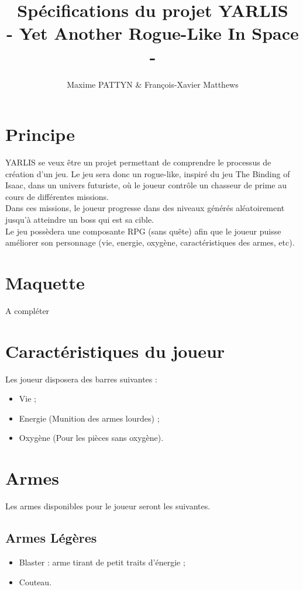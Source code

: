 \documentclass[a4paper,12pt]{article}
\title{Spécifications du projet YARLIS\\- Yet Another Rogue-Like In Space -}
\author{Maxime PATTYN \& François-Xavier Matthews}
\begin{document}
\maketitle

\section{Principe}
YARLIS se veux être un projet permettant de comprendre le processus de création d'un jeu.
Le jeu sera donc un rogue-like, inspiré du jeu The Binding of Isaac, dans un univers futuriste, 
où le joueur contrôle un chasseur de prime au cours de différentes missions.\\
Dans ces missions, le joueur progresse dans des niveaux générés aléatoirement jusqu'à atteindre un boss
qui est sa cible.\\
Le jeu possèdera une composante RPG (sans quête) afin que le joueur puisse améliorer son personnage
(vie, energie, oxygène, caractéristiques des armes, etc).


\section{Maquette}

A compléter


\section{Caractéristiques du joueur}
Les joueur disposera des barres suivantes :
\begin{itemize}
  \item Vie ; 
  \item Energie (Munition des armes lourdes) ;
  \item Oxygène (Pour les pièces sans oxygène).
\end{itemize}


\section{Armes}

Les armes disponibles pour le joueur seront les suivantes.

\subsection{Armes Légères}
\begin{itemize}
  \item Blaster : arme tirant de petit traits d'énergie ;
  \item Couteau.
\end{itemize}
\end{document}
